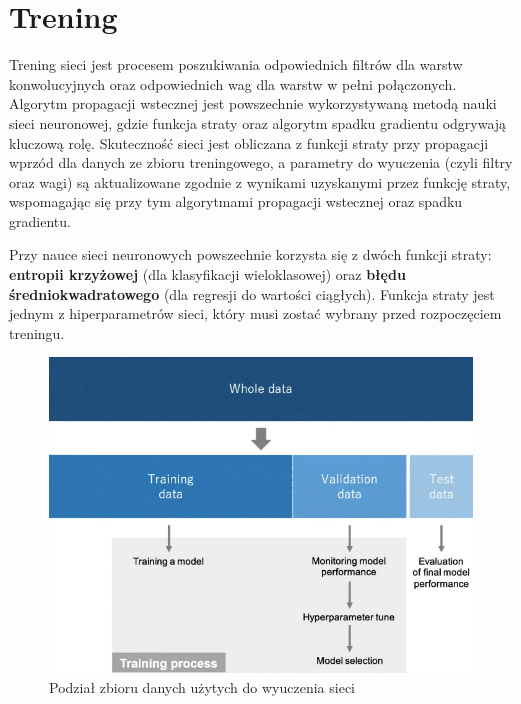 \section{Trening}
Trening sieci jest procesem poszukiwania odpowiednich filtrów dla warstw konwolucyjnych oraz odpowiednich wag dla warstw w pełni połączonych. Algorytm propagacji wstecznej \cite{kostadinov:backpropagation} jest powszechnie wykorzystywaną metodą nauki sieci neuronowej, gdzie funkcja straty \cite{brownlee:lossFun} oraz algorytm spadku gradientu \cite{kwiatkowski:gradientDescent} odgrywają kluczową rolę. Skuteczność sieci jest obliczana z funkcji straty przy propagacji wprzód dla danych ze zbioru treningowego, a parametry do wyuczenia (czyli filtry oraz wagi) są aktualizowane zgodnie z wynikami uzyskanymi przez funkcję straty, wspomagając się przy tym algorytmami propagacji wstecznej oraz spadku gradientu.

Przy nauce sieci neuronowych powszechnie korzysta się z dwóch funkcji straty: \textbf{entropii krzyżowej} (dla klasyfikacji wieloklasowej) \cite{brownlee:crossEntropy} oraz \textbf{błędu średniokwadratowego} (dla regresji do wartości ciągłych). Funkcja straty jest jednym z hiperparametrów sieci, który musi zostać wybrany przed rozpoczęciem treningu. \\

\begin{figure}[h]
\begin{center}
\includegraphics[width=15cm]{resources/figures/datasets.png}
\caption{Podział zbioru danych użytych do wyuczenia sieci}
\label{DatasetDivision}
\end{center}
\end{figure}

